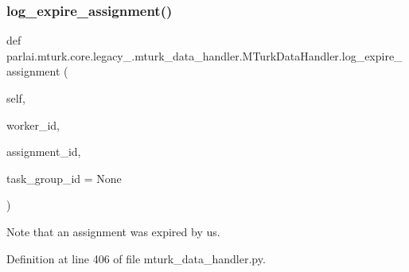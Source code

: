 \subsubsection{\texorpdfstring{log\+\_\+expire\+\_\+assignment()}{log\_expire\_assignment()}}
{\footnotesize\ttfamily def parlai.\+mturk.\+core.\+legacy\+\_.\+mturk\+\_\+data\+\_\+handler.\+M\+Turk\+Data\+Handler.\+log\+\_\+expire\+\_\+assignment (\begin{DoxyParamCaption}\item[{}]{self,  }\item[{}]{worker\+\_\+id,  }\item[{}]{assignment\+\_\+id,  }\item[{}]{task\+\_\+group\+\_\+id = {\ttfamily None} }\end{DoxyParamCaption})}

\begin{DoxyVerb}Note that an assignment was expired by us.
\end{DoxyVerb}
 

Definition at line 406 of file mturk\+\_\+data\+\_\+handler.\+py.


